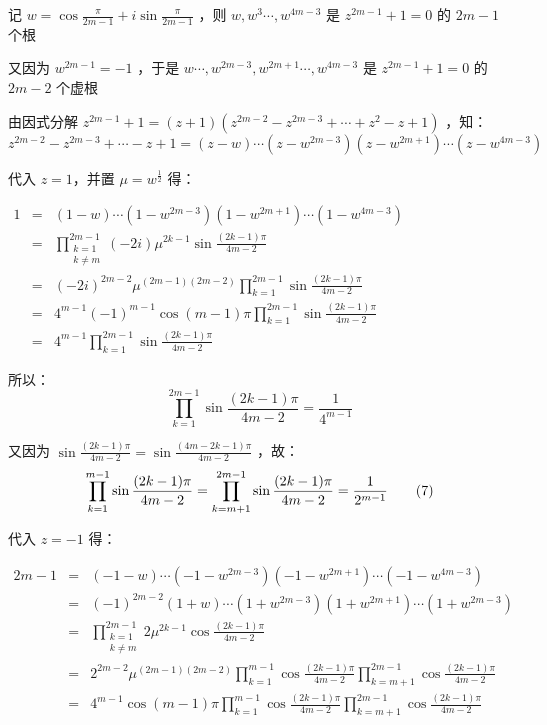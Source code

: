 记 $\displaystyle{w=\cos\frac{\pi}{2m-1}+i\sin\frac{\pi}{2m-1}}$ ，则 $w,w^3\cdots,w^{4m-3}$ 是 $z^{2m-1}+1=0$ 的 $2m-1$ 个根

又因为 $w^{2m-1}=-1$ ，于是 $w\cdots ,w^{2m-3},w^{2m+1}\cdots ,w^{4m-3}$ 是 $z^{2m-1}+1=0$ 的 $2m-2$ 个虚根

由因式分解 $z^{2m-1}+1=(z+1)(z^{2m-2}-z^{2m-3}+\cdots+z^{2}-z+1)$ ，知：
$$z^{2m-2}-z^{2m-3}+\cdots-z+1=(z-w)\cdots(z-w^{2m-3})(z-w^{2m+1})\cdots(z-w^{4m-3})$$

代入 $z=1$，并置 $\mu=w^{\frac12}$ 得：

$\begin{eqnarray*} 1&=&(1-w)\cdots(1-w^{2m-3})(1-w^{2m+1})\cdots(1-w^{4m-3})\\&=&\prod_{\substack{k=1\\k\neq m}}^{2m-1}(-2i)\mu^{2k-1}\sin\frac{(2k-1)\pi}{4m-2}\\&=&(-2i)^{2m-2}{\mu}^{(2m-1)(2m-2)}\prod_{k=1}^{2m-1}\sin{\frac{(2k-1)\pi}{4m-2}}\\ &=&4^{m-1}(-1)^{m-1}\cos(m-1)\pi\prod_{k=1}^{2m-1}\sin{\frac{(2k-1)\pi}{4m-2}}\\ &=&4^{m-1}\prod_{k=1}^{2m-1}\sin{\frac{(2k-1)\pi}{4m-2}}  \end{eqnarray*}$

所以： 
\begin{equation}
\prod_{k=1}^{2m-1}\sin{\frac{(2k-1)\pi}{4m-2}}=\frac{1}{4^{m-1}}\tag{6}
\end{equation}

又因为 $\displaystyle{\sin\frac{(2k-1)\pi}{4m-2}=\sin\frac{(4m-2k-1)\pi}{4m-2}}$ ，故：
\begin{equation}
\prod_{k=1}^{m-1}\sin{\frac{(2k-1)\pi}{4m-2}}=\prod_{k=m+1}^{2m-1}\sin{\frac{(2k-1)\pi}{4m-2}}=\frac{1}{2^{m-1}}\\\tag{7}
\end{equation}

代入 $z=-1$ 得：

$\begin{eqnarray*} 2m-1&=&(-1-w)\cdots(-1-w^{2m-3})(-1-w^{2m+1})\cdots(-1-w^{4m-3})\\ &=&(-1)^{2m-2}(1+w)\cdots(1+w^{2m-3})(1+w^{2m+1})\cdots(1+w^{2m-3})\\ &=&\prod_{\substack{k=1\\k\neq m}}^{2m-1}2\mu^{2k-1}\cos\frac{(2k-1)\pi}{4m-2}\\ &=&2^{2m-2}\mu^{(2m-1)(2m-2)}\prod_{k=1}^{m-1}\cos{\frac{(2k-1)\pi}{4m-2}}\prod_{k=m+1}^{2m-1}\cos{\frac{(2k-1)\pi}{4m-2}}\\ &=&4^{m-1}\cos(m-1)\pi\prod_{k=1}^{m-1}\cos{\frac{(2k-1)\pi}{4m-2}}\prod_{k=m+1}^{2m-1}\cos{\frac{(2k-1)\pi}{4m-2}} \end{eqnarray*}$

